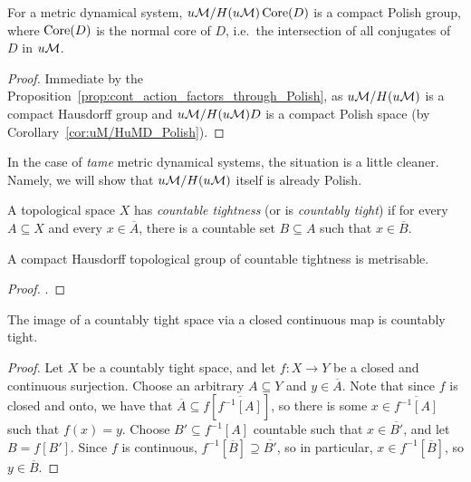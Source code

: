 	\begin{cor}\label{cor:Polish_quotient_Core(D)}
		For a metric dynamical system, $u{\mathcal M}/H(u{\mathcal M})\operatorname{{Core}}(D)$ is a compact Polish group, where $\operatorname{{Core}}(D)$ is the normal core of $D$, i.e.\ the intersection of all conjugates of $D$ in $u{\mathcal M}$.
	\end{cor}
	\begin{proof}
		Immediate by the Proposition~\ref{prop:cont_action_factors_through_Polish}, as $u{\mathcal M}/H(u{\mathcal M})$ is a compact Hausdorff group and $u{\mathcal M}/H(u{\mathcal M})D$ is a compact Polish space (by Corollary~\ref{cor:uM/HuMD_Polish}).
	\end{proof}
	
	In the case of \emph{tame} metric dynamical systems, the situation is a little cleaner. Namely, we will show that $u{\mathcal M}/H(u{\mathcal M})$ itself is already Polish.
	
	\begin{dfn}
		A topological space $X$ has {\em countable tightness} (or is \emph{countably tight}) if for every $A\subseteq X$ and every $x\in \overline A$, there is a countable set $B\subseteq A$ such that $x\in \overline B$.
		\xqed{\lozenge}
	\end{dfn}
	
	\begin{fct}[Engelking]\label{fct:tightness}
		A compact Hausdorff topological group of countable tightness is metrisable.
	\end{fct}
	\begin{proof}
		\cite[Corollary 4.2.2]{AT08}.
	\end{proof}
	
	\begin{prop}
		\label{prop:closed_image_is_tight}
		The image of a countably tight space via a closed continuous map is countably tight.
	\end{prop}
	\begin{proof}
		Let $X$ be a countably tight space, and let $f\colon X\to Y$ be a closed and continuous surjection. Choose an arbitrary $A\subseteq Y$ and $y\in \overline A$. Note that since $f$ is closed and onto, we have that $\overline A\subseteq f\left[\overline{f^{-1}[A]}\right]$, so there is some $x\in \overline{f^{-1}[A]}$ such that $f(x)=y$. Choose $B'\subseteq f^{-1}[A]$ countable such that $x\in \overline {B'}$, and let $B=f[B']$. Since $f$ is continuous, $f^{-1}\left[\overline B\right]\supseteq \overline{B'}$, so in particular, $x\in f^{-1}\left[\overline B\right]$, so $y\in \overline B$.
	\end{proof}
	
